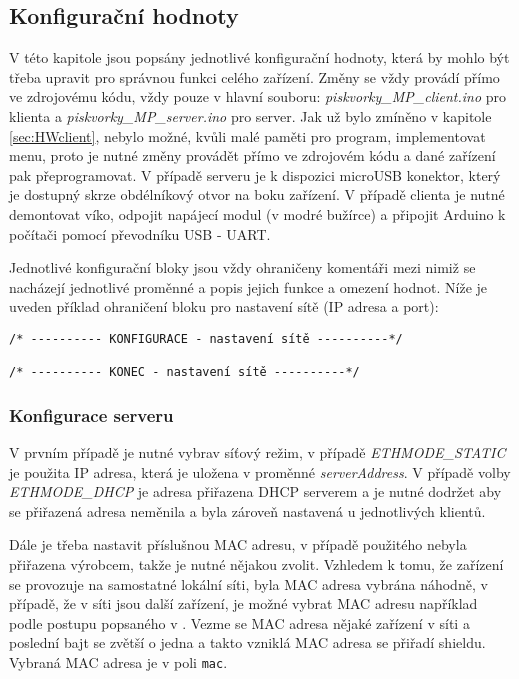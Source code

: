 \subsection{Konfigurační hodnoty}
V této kapitole jsou popsány jednotlivé konfigurační hodnoty, která by mohlo být třeba upravit pro správnou funkci celého zařízení. Změny se vždy provádí přímo ve zdrojovému kódu, vždy pouze v hlavní souboru: \textit{piskvorky\_MP\_client.ino} pro klienta a \textit{piskvorky\_MP\_server.ino} pro server. Jak už bylo zmíněno v kapitole \ref{sec:HWclient}, nebylo možné, kvůli malé paměti pro program, implementovat menu, proto je nutné změny provádět přímo ve zdrojovém kódu a dané zařízení pak přeprogramovat. V případě serveru je k dispozici microUSB konektor, který je dostupný skrze obdélníkový otvor na boku zařízení. V případě clienta je nutné demontovat víko, odpojit napájecí modul (v modré bužírce) a připojit Arduino k počítači pomocí převodníku USB - UART.

Jednotlivé konfigurační bloky jsou vždy ohraničeny komentáři mezi nimiž se nacházejí jednotlivé proměnné a popis jejich funkce a omezení hodnot. Níže je uveden příklad ohraničení bloku pro nastavení sítě (IP adresa a port):
\begin{verbatim}
/* ---------- KONFIGURACE - nastavení sítě ----------*/

/* ---------- KONEC - nastavení sítě ----------*/
\end{verbatim}


\subsubsection{Konfigurace serveru}
\label{sec:server-nastaveni}
V prvním případě je nutné vybrav síťový režim, v případě \textit{ETHMODE\_STATIC} je použita IP adresa, která je uložena v proměnné \textit{serverAddress}. V případě volby \textit{ETHMODE\_DHCP} je adresa přiřazena DHCP serverem a je nutné dodržet aby se přiřazená adresa neměnila a byla zároveň nastavená u jednotlivých klientů.

Dále je třeba nastavit příslušnou MAC adresu, v případě použitého nebyla přiřazena výrobcem, takže je nutné nějakou zvolit. Vzhledem k tomu, že zařízení se provozuje na samostatné lokální síti, byla MAC adresa vybrána náhodně, v případě, že v síti jsou další zařízení, je možné vybrat MAC adresu například podle postupu popsaného v \cite{vyberMAC}. Vezme se MAC adresa nějaké zařízení v síti a poslední bajt se zvětší o jedna a takto vzniklá MAC adresa se přiřadí shieldu.
Vybraná MAC adresa je v poli \texttt{mac}.

